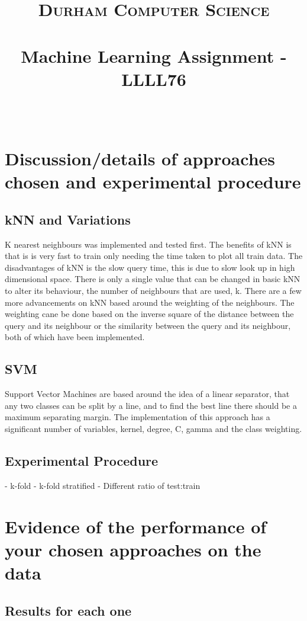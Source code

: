 \documentclass[paper=a4, fontsize=11pt]{scrartcl}
\date{}
\title{
		\vspace{-0.5in} 	
		\usefont{OT1}{bch}{b}{n}
		\normalfont \normalsize \textsc{Durham Computer Science} \\ [5pt]
		\horrule{0.5pt} \\[0.4cm]
		\huge Machine Learning Assignment - LLLL76\\
		\horrule{2pt} \\[0.5cm]
		\vspace{-1in} 	
}
\numberwithin{equation}{section}		%
\numberwithin{figure}{section}			%
\numberwithin{table}{section}				%
\begin{document}
\maketitle
\section{Discussion/details of approaches chosen and experimental procedure}

\subsection{kNN and Variations}

K nearest neighbours was implemented and tested first. The benefits of kNN is that is is very fast to train only needing the time taken to plot all train data. The disadvantages of kNN is the slow query time, this is due to slow look up in high dimensional space. There is only a single value that can be changed in basic kNN to alter its behaviour, the number of neighbours that are used, k. There are a few more advancements on kNN based around the weighting of the neighbours. The weighting cane be done based on the inverse square of the distance between the query and its neighbour or the similarity between the query and its neighbour, both of which have been implemented.

\subsection{SVM}

Support Vector Machines are based around the idea of a linear separator, that any two classes can be split by a line, and to find the best line there should be a maximum separating margin. The implementation of this approach has a significant number of variables, kernel, degree, C, gamma and the class weighting.

\subsection{Experimental Procedure}

- k-fold
- k-fold stratified
- Different ratio of test:train

\section{Evidence of the performance of your chosen approaches on the data}

\subsection{Results for each one}
\end{document}
